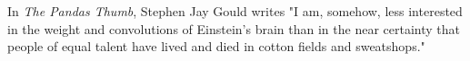 

In \textit{The Pandas Thumb}, Stephen Jay Gould writes "I am, somehow, less interested in the weight and convolutions of Einstein’s
brain than in the near certainty that people of equal talent have lived and
died in cotton fields and sweatshops."   